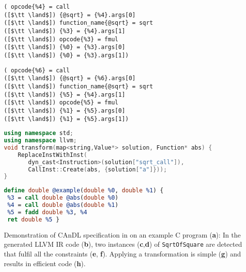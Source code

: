 \begin{minipage}[t]{\textwidth}
\begin{minipage}[t]{0.493\textwidth}
\centering
\vspace{-0.19cm}
\begin{lstlisting}[language=CAnDL,
                   numbers=none,framexleftmargin=0pt,xleftmargin=0pt,
                   captionpos=t,title=
   {{\bf(e)} {} Verification of first solution:}]
( opcode{%4} = call
([$\tt \land$]) {@sqrt} = {%4}.args[0]
([$\tt \land$]) function_name{@sqrt} = sqrt
([$\tt \land$]) {%3} = {%4}.args[1]
([$\tt \land$]) opcode{%3} = fmul
([$\tt \land$]) {%0} = {%3}.args[0]
([$\tt \land$]) {%0} = {%3}.args[1])
\end{lstlisting}
\end{minipage}
\hfill
\begin{minipage}[t]{0.493\textwidth}
\centering
\vspace{-0.19cm}
\begin{lstlisting}[language=CAnDL,
                   numbers=none,framexleftmargin=0pt,xleftmargin=0pt,
                   captionpos=t,title=
   {{\bf(f)} {} Verification of second solution:}]
( opcode{%6} = call
([$\tt \land$]) {@sqrt} = {%6}.args[0]
([$\tt \land$]) function_name{@sqrt} = sqrt
([$\tt \land$]) {%5} = {%4}.args[1]
([$\tt \land$]) opcode{%5} = fmul
([$\tt \land$]) {%1} = {%5}.args[0]
([$\tt \land$]) {%1} = {%5}.args[1])
\end{lstlisting}
\end{minipage}
\end{minipage}

\begin{minipage}[t]{\textwidth}
\centering
\vspace{-0.19cm}
\begin{lstlisting}[language=C++,captionpos=t,title=
   {{\bf(g)} {} C++ transformation code:}]
using namespace std;
using namespace llvm;
void transform(map<string,Value*> solution, Function* abs) {
    ReplaceInstWithInst(
       dyn_cast<Instruction>(solution["sqrt_call"]),
       CallInst::Create(abs, {solution["a"]}));
}
\end{lstlisting}
\end{minipage}

\begin{minipage}[t]{\textwidth}
\centering
\vspace{-0.19cm}
\begin{lstlisting}[language=LLVM,captionpos=t,title=
   {{\bf(h)} {} Transformed LLVM IR after dead code elimination:}]
define double @example(double %0, double %1) {              
 %3 = call double @abs(double %0) 
 %4 = call double @abs(double %1)
 %5 = fadd double %3, %4   
 ret double %5 }
\end{lstlisting}
\end{minipage}

\caption{Demonstration of CAnDL specification in 
         on an example C program ({\bf a}):
         In the generated LLVM IR code ({\bf b}), two instances
         ({\bf c},{\bf d}) of {\tt SqrtOfSquare} are detected that fulfil all
         the constraints ({\bf e}, {\bf f}).
         Applying a transformation is simple ({\bf g}) and results in efficient
         code ({\bf h}).\parfillskip=0pt}
